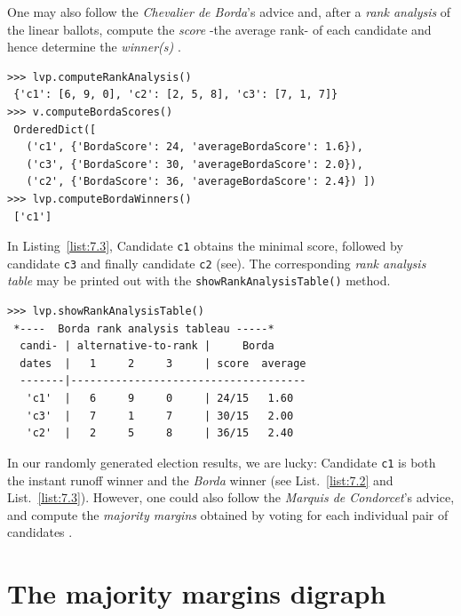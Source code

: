 One may also follow the \emph{Chevalier de Borda}'s advice and, after a \emph{rank analysis} of the linear ballots, compute the \Borda \emph{score} -the average rank- of each candidate and hence determine the \Borda \emph{winner(s)} \citep{BOR-1781}.
\begin{lstlisting}[caption={Example of \Borda rank scores},label=list:7.3]
>>> lvp.computeRankAnalysis()
 {'c1': [6, 9, 0], 'c2': [2, 5, 8], 'c3': [7, 1, 7]}
>>> v.computeBordaScores()
 OrderedDict([
   ('c1', {'BordaScore': 24, 'averageBordaScore': 1.6}),
   ('c3', {'BordaScore': 30, 'averageBordaScore': 2.0}),
   ('c2', {'BordaScore': 36, 'averageBordaScore': 2.4}) ])
>>> lvp.computeBordaWinners()
 ['c1']
\end{lstlisting}

In  Listing~\vref{list:7.3}, Candidate \texttt{c1} obtains the minimal \Borda score, followed by candidate \texttt{c3} and finally candidate \texttt{c2} (see). The corresponding \Borda \emph{rank analysis table} may be printed out with the \texttt{showRankAnalysisTable()} method.
\begin{lstlisting}[caption={Rank analysis example},label=list:7.4]
>>> lvp.showRankAnalysisTable()
 *----  Borda rank analysis tableau -----*
  candi- | alternative-to-rank |     Borda
  dates  |   1     2     3     | score  average
  -------|-------------------------------------
   'c1'  |   6     9     0     | 24/15   1.60
   'c3'  |   7     1     7     | 30/15   2.00
   'c2'  |   2     5     8     | 36/15   2.40
 \end{lstlisting}

In our randomly generated election results, we are lucky: Candidate \texttt{c1} is both the instant runoff winner and the \emph{Borda} winner (see List.~\vref{list:7.2} and List.~\vref{list:7.3}). However, one could also follow the \emph{Marquis de Condorcet}'s advice, and compute the \emph{majority margins} obtained by voting for each individual pair of candidates \citep{CON-1784}.

\section{The majority margins digraph}
\label{sec:7.3}

